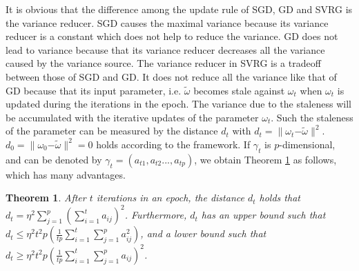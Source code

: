 \documentclass[letterpaper]{article}
\begin{document}
It is obvious that the difference among the update rule of SGD, GD and SVRG is the variance reducer. SGD causes the maximal variance because its variance reducer is a constant which does not help to reduce the variance. GD does not lead to variance because that its variance reducer decreases all the variance caused by the variance source. The variance reducer in SVRG is a tradeoff  between those of SGD and GD. It does not reduce all the variance like that of GD because that its input parameter, i.e. $\tilde{\omega}$ becomes stale against $\omega_{t}$  when   $\omega_{t}$  is updated during the iterations in the epoch. The variance due to the staleness will be accumulated with the iterative updates of the parameter $\omega_{t}$.   Such the staleness of the parameter can be measured by  the distance $d_t$ with $d_t = \parallel \omega_{t} \mathrm{-} \tilde{\omega} \parallel^2$. $d_0 = \parallel \omega_{0}\mathrm{-}\tilde{\omega}\parallel^2 = 0$ holds according to the framework. If $\gamma_t$ is $p$-dimensional, and can be denoted by  $\gamma_t = (a_{t1}, a_{t2}..., a_{tp})$, we obtain Theorem \ref{theorem_vr_lower_bound}  as follows, which has many advantages.


\newtheorem{Theorem}{\bf{Theorem}}
\newtheorem{Corollary}{\bf{Corollary}}
\newtheorem{Lemma}{\bf{Lemma}}
\newtheorem{Assumption}{\bf{Assumption}}


\begin{Theorem}
\label{theorem_vr_lower_bound}
   After $t$ iterations in an epoch, the distance $d_t$ holds that $d_t \mathrm{=} \eta^2 \sum\limits_{j=1}^p\left(  \sum\limits_{i=1}^t a_{ij}  \right)^2$. Furthermore, $d_t$ has an upper bound such that 
   $d_t \mathrm{\le} \eta^2 t^2p  \left( \frac{1}{tp}\sum\limits_{i=1}^t   \sum\limits_{j=1}^p   a_{ij}^2 \right)$, and a lower bound such that $d_t  \mathrm{\ge} \eta^2t^2p \left(\frac{1}{tp}\sum\limits_{i=1}^t   \sum\limits_{j=1}^p   a_{ij}\right)^2$.
\end{Theorem}
\end{document}
